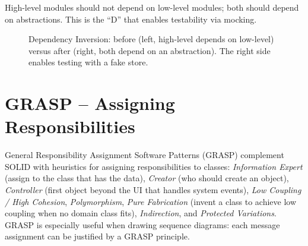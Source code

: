High-level modules should not depend on low-level modules; both should depend on abstractions. This is the ``D'' that enables testability via mocking.

\begin{figure}[h]
\centering
{}
\caption{Dependency Inversion: before (left, high-level depends on low-level) versus after (right, both depend on an abstraction). The right side enables testing with a fake store.}
\end{figure}


\section{GRASP -- Assigning Responsibilities}

General Responsibility Assignment Software Patterns (GRASP) complement SOLID with heuristics for assigning responsibilities to classes: \emph{Information Expert} (assign to the class that has the data), \emph{Creator} (who should create an object), \emph{Controller} (first object beyond the UI that handles system events), \emph{Low Coupling / High Cohesion}, \emph{Polymorphism}, \emph{Pure Fabrication} (invent a class to achieve low coupling when no domain class fits), \emph{Indirection}, and \emph{Protected Variations}. GRASP is especially useful when drawing sequence diagrams: each message assignment can be justified by a GRASP principle.

